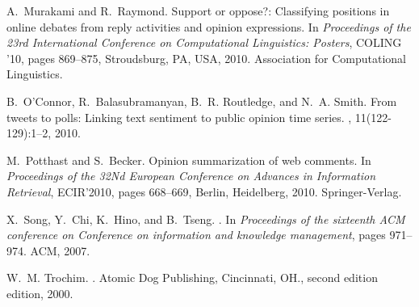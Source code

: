 \documentclass{llncs}
\begin{document}
\begin{thebibliography}{10}
A.~Murakami and R.~Raymond.
\newblock Support or oppose?: Classifying positions in online debates from
  reply activities and opinion expressions.
\newblock In {\em Proceedings of the 23rd International Conference on
  Computational Linguistics: Posters}, COLING '10, pages 869--875, Stroudsburg,
  PA, USA, 2010. Association for Computational Linguistics.

B.~O'Connor, R.~Balasubramanyan, B.~R. Routledge, and N.~A. Smith.
\newblock From tweets to polls: Linking text sentiment to public opinion time
  series.
, 11(122-129):1--2, 2010.

M.~Potthast and S.~Becker.
\newblock Opinion summarization of web comments.
\newblock In {\em Proceedings of the 32Nd European Conference on Advances in
  Information Retrieval}, ECIR'2010, pages 668--669, Berlin, Heidelberg, 2010.
  Springer-Verlag.

X.~Song, Y.~Chi, K.~Hino, and B.~Tseng.
.
\newblock In {\em Proceedings of the sixteenth ACM conference on Conference on
  information and knowledge management}, pages 971--974. ACM, 2007.

W.~M. Trochim.
.
\newblock Atomic Dog Publishing, Cincinnati, OH., second edition edition, 2000.

\end{thebibliography}
\end{document}
